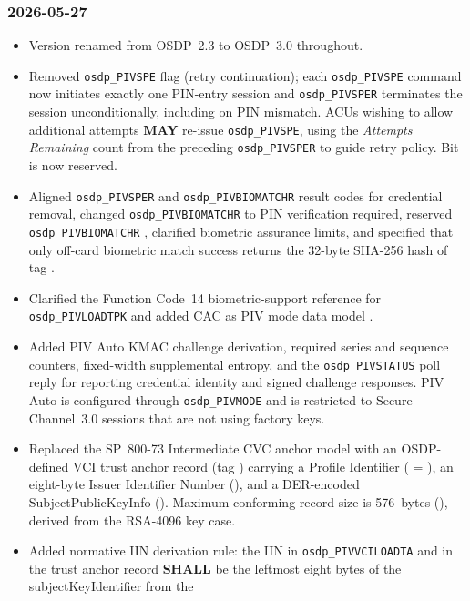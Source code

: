 \subsubsection*{2026-05-27}
\begin{itemize}
  \item Version renamed from OSDP~2.3 to OSDP~3.0 throughout.
  \item Removed \texttt{osdp\_PIVSPE} flag  (retry continuation); each
    \texttt{osdp\_PIVSPE} command now initiates exactly one PIN-entry session and
    \texttt{osdp\_PIVSPER} terminates the session unconditionally, including on PIN mismatch. ACUs
    wishing to allow additional attempts \textbf{MAY} re-issue \texttt{osdp\_PIVSPE}, using the
    \emph{Attempts Remaining} count from the preceding \texttt{osdp\_PIVSPER} to guide retry policy.
    Bit  is now reserved.
  \item Aligned \texttt{osdp\_PIVSPER} and \texttt{osdp\_PIVBIOMATCHR} result codes for credential
    removal, changed \texttt{osdp\_PIVBIOMATCHR}  to PIN verification required, reserved
    \texttt{osdp\_PIVBIOMATCHR} , clarified biometric assurance limits, and specified
    that only off-card biometric match success returns the 32-byte SHA-256 hash of tag .
  \item Clarified the Function Code~14 biometric-support reference for \texttt{osdp\_PIVLOADTPK} and
    added CAC as PIV mode data model .
  \item Added PIV Auto KMAC challenge derivation, required series and sequence counters, fixed-width
    supplemental entropy, and the \texttt{osdp\_PIVSTATUS} poll reply for reporting credential
    identity and signed challenge responses. PIV Auto is configured through \texttt{osdp\_PIVMODE}
    and is restricted to Secure Channel~3.0 sessions that are not using factory keys.
  \item Replaced the SP~800-73 Intermediate CVC anchor model with an OSDP-defined VCI trust anchor
    record (tag ) carrying a Profile Identifier ( = ), an
    eight-byte Issuer Identifier Number (), and a DER-encoded SubjectPublicKeyInfo
    (). Maximum conforming record size is 576~bytes (), derived from the
    RSA-4096 key case.
  \item Added normative IIN derivation rule: the IIN in \texttt{osdp\_PIVVCILOADTA} and in the trust
    anchor record \textbf{SHALL} be the leftmost eight bytes of the subjectKeyIdentifier from the

\end{itemize}
